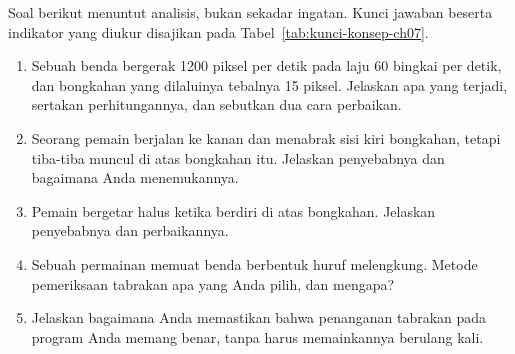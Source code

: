 Soal berikut menuntut analisis, bukan sekadar ingatan. Kunci jawaban beserta
indikator yang diukur disajikan pada Tabel~\ref{tab:kunci-konsep-ch07}.

\begin{enumerate}
  \item Sebuah benda bergerak 1200 piksel per detik pada laju 60 bingkai per
        detik, dan bongkahan yang dilaluinya tebalnya 15 piksel. Jelaskan apa
        yang terjadi, sertakan perhitungannya, dan sebutkan dua cara
        perbaikan.
  \item Seorang pemain berjalan ke kanan dan menabrak sisi kiri bongkahan,
        tetapi tiba-tiba muncul di atas bongkahan itu. Jelaskan penyebabnya
        dan bagaimana Anda menemukannya.
  \item Pemain bergetar halus ketika berdiri di atas bongkahan. Jelaskan
        penyebabnya dan perbaikannya.
  \item Sebuah permainan memuat benda berbentuk huruf melengkung. Metode
        pemeriksaan tabrakan apa yang Anda pilih, dan mengapa?
  \item Jelaskan bagaimana Anda memastikan bahwa penanganan tabrakan pada
        program Anda memang benar, tanpa harus memainkannya berulang kali.
\end{enumerate}

